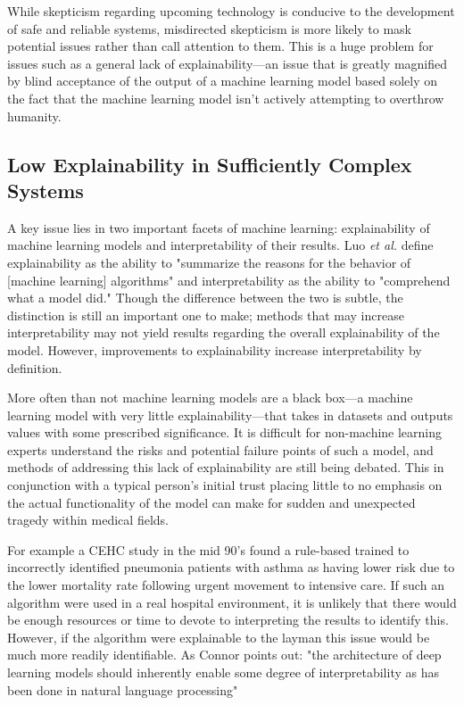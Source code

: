 \documentclass[]{article}
\begin{document}
		While skepticism regarding upcoming technology is conducive to the development of safe and reliable systems, misdirected skepticism is more likely to mask potential issues rather than call attention to them. This is a huge problem for issues such as a general lack of explainability---an issue that is greatly magnified by blind acceptance of the output of a machine learning model based solely on the fact that the machine learning model isn't actively attempting to overthrow humanity. 

		\subsection{Low Explainability in Sufficiently Complex Systems}
			A key issue lies in two important facets of machine learning: explainability of machine learning models and interpretability of their results. Luo \emph{et al.} define explainability as the ability to "summarize the reasons for the behavior of [machine learning] algorithms" and interpretability as the ability to "comprehend what a model did."\cite{doi:10.1259/bjro.20190021} Though the difference between the two is subtle, the distinction is still an important one to make; methods that may increase interpretability may not yield results regarding the overall explainability of the model. However, improvements to explainability increase interpretability by definition.

			More often than not machine learning models are a black box---a machine learning model with very little explainability---that takes in datasets and outputs values with some prescribed significance. It is difficult for non-machine learning experts understand the risks and potential failure points of such a model, and methods of addressing this lack of explainability are still being debated.\cite{10.1145/2858036.2858529,10.1145/3328519.3329126} This in conjunction with a typical person's initial trust placing little to no emphasis on the actual functionality of the model\cite{siau2018building} can make for sudden and unexpected tragedy within medical fields.
			
			For example a CEHC study in the mid 90's found a rule-based trained to incorrectly identified pneumonia patients with asthma as having lower risk due to the lower mortality rate following urgent movement to intensive care.\cite{caruana2015intelligible} If such an algorithm were used in a real hospital environment, it is unlikely that there would be enough resources or time to devote to interpreting the results to identify this. However, if the algorithm were explainable to the layman this issue would be much more readily identifiable. As Connor points out: "the architecture of deep learning models should inherently enable some degree of interpretability as has been done in natural language processing"
\end{document}
